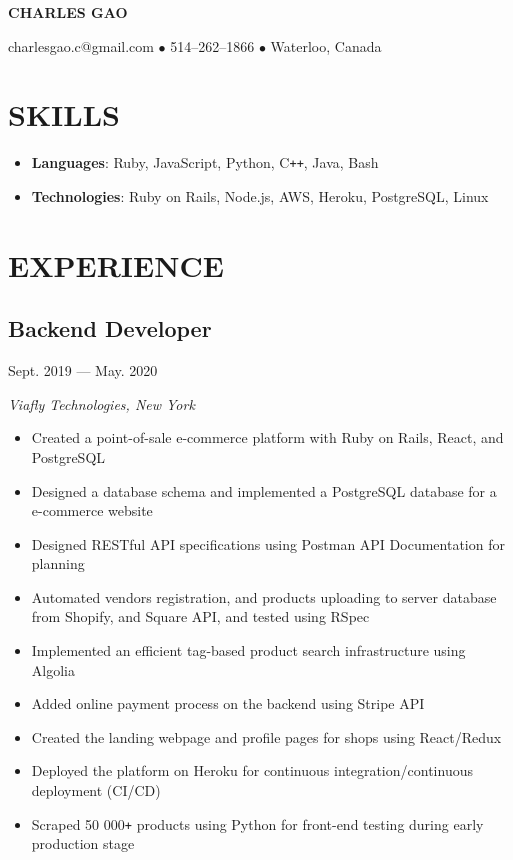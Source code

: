 \documentclass[11pt]{extarticle}
\begin{document}
\begin{center}
\textbf{\huge{CHARLES GAO}}

charlesgao.c@gmail.com $\bullet$ 514--262--1866 $\bullet$ Waterloo, Canada
\end{center}

\section*{SKILLS}
\begin{itemize}
  \item \textbf{Languages}: Ruby, JavaScript, Python, C\texttt{++}, Java, Bash
  \item \textbf{Technologies}: Ruby on Rails, Node.js, AWS, Heroku, PostgreSQL, Linux
\end{itemize}


\section*{EXPERIENCE}
\subsection*{Backend Developer} \hfill {Sept. 2019 --- May. 2020}

\textit{Viafly Technologies, New York}
\begin{itemize}
  \item Created a point-of-sale e-commerce platform with Ruby on Rails, React, and PostgreSQL
  \item Designed a database schema and implemented a PostgreSQL database for a e-commerce website
  \item Designed RESTful API specifications using Postman API Documentation for planning
  \item Automated vendors registration, and products uploading to server database from Shopify, and Square API, and tested using RSpec
  \item Implemented an efficient tag-based product search infrastructure using Algolia
  \item Added online payment process on the backend using Stripe API
  \item Created the landing webpage and profile pages for shops using React/Redux
  \item Deployed the platform on Heroku for continuous integration/continuous deployment (CI/CD)
  \item Scraped 50 000\texttt{+} products using Python for front-end testing during early production stage
\end{itemize}
\end{document}
